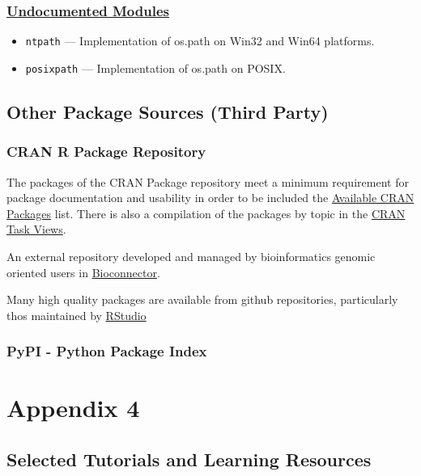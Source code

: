 \documentclass[]{book}
\providecommand{\tightlist}{%
  \setlength{\itemsep}{0pt}\setlength{\parskip}{0pt}}
\theoremstyle{definition}
\theoremstyle{definition}
\theoremstyle{definition}
\theoremstyle{remark}
\begin{document}
\subsection{\texorpdfstring{\href{https://docs.python.org/3.7/library/undoc.html}{Undocumented
Modules}}{Undocumented Modules}}\label{undocumented-modules}

\begin{itemize}
\tightlist
\item
  \texttt{ntpath} --- Implementation of os.path on Win32 and Win64
  platforms.
\item
  \texttt{posixpath} --- Implementation of os.path on POSIX.
\end{itemize}

\section{Other Package Sources (Third
Party)}\label{other-package-sources-third-party}

\subsection{CRAN R Package Repository}\label{cran-r-package-repository}

The packages of the CRAN Package repository meet a minimum requirement
for package documentation and usability in order to be included the
\href{https://cran.cnr.berkeley.edu/web/packages/index.html}{Available
CRAN Packages} list. There is also a compilation of the packages by
topic in the \href{https://cran.cnr.berkeley.edu/web/views/}{CRAN Task
Views}.

An external repository developed and managed by bioinformatics genomic
oriented users in \href{https://www.bioconductor.org/}{Bioconnector}.

Many high quality packages are available from github repositories,
particularly thos maintained by
\href{https://www.rstudio.com/products/rpackages/}{RStudio}

\subsection{PyPI - Python Package
Index}\label{pypi---python-package-index}

\chapter{Appendix 4}\label{appendix-4}

\section{Selected Tutorials and Learning
Resources}\label{selected-tutorials-and-learning-resources}
\end{document}
